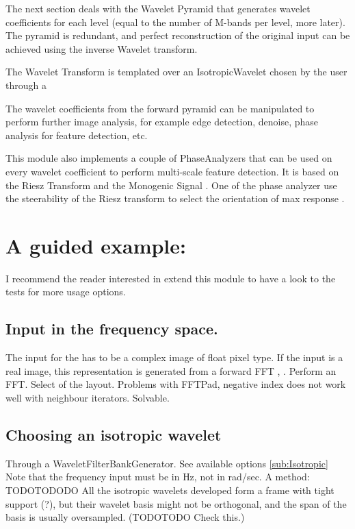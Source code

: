 \documentclass{InsightArticle}
\theoremstyle{definition}
\begin{document}
The next section deals with the Wavelet Pyramid that generates wavelet coefficients for each level (equal to the number of M-bands per level, more later).  The pyramid is redundant, and perfect reconstruction of the original input can be achieved using the inverse Wavelet transform.

The Wavelet Transform is templated over an IsotropicWavelet chosen by the user through a 

The wavelet coefficients from the forward pyramid can be manipulated to perform further image analysis, for example edge detection, denoise, phase analysis for feature detection, etc.

This module also implements a couple of PhaseAnalyzers that can be used on every wavelet coefficient to perform multi-scale feature detection. It is based on the Riesz Transform and the Monogenic Signal \cite{felsberg_monogenic_2001,unser_multiresolution_2009}.
One of the phase analyzer use the steerability of the Riesz transform to select the orientation of max response \cite{held_steerable_2010,unser_steerable_2011}.

\section{A guided example:}
I recommend the reader interested in extend this module to have a look to the tests for more usage options.
\subsection{Input in the frequency space.}
The input for the  has to be a complex image of float pixel type. If the input is a real image, this representation is generated from a forward FFT , .
Perform an FFT. Select of the layout.
Problems with FFTPad, negative index does not work well with neighbour iterators. Solvable.
\subsection{Choosing an isotropic wavelet}
\label{sub:Choosing}
Through a WaveletFilterBankGenerator. See available options \ref{sub:Isotropic}
Note that the frequency input must be in Hz, not in rad/sec. A method: TODOTODODO
All the isotropic wavelets developed form a frame with tight support (?), but their wavelet basis might not be orthogonal, and the span of the basis is usually oversampled. (TODOTODO Check this.)
\end{document}
